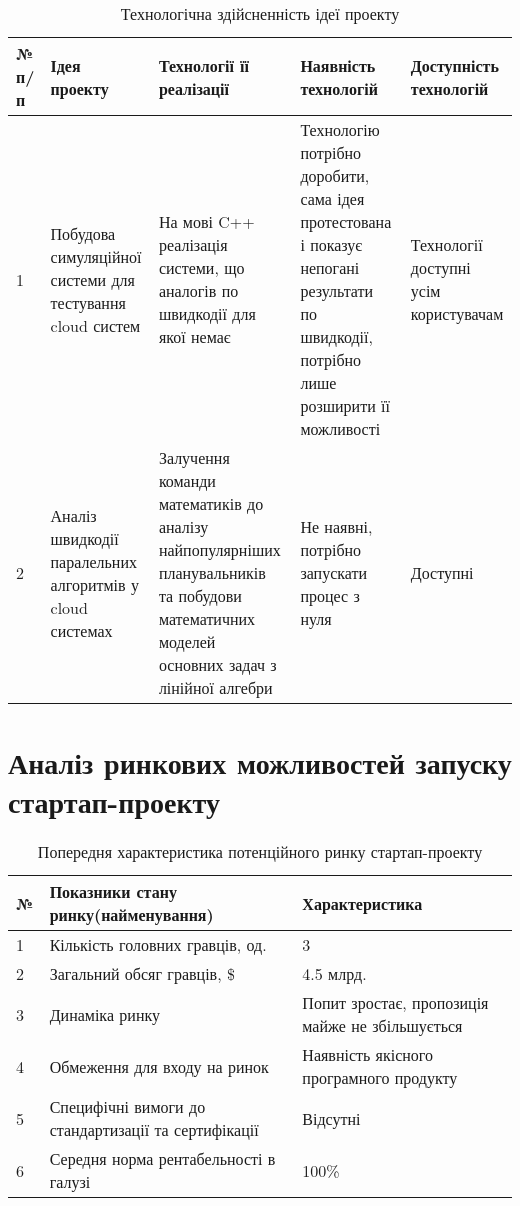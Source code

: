 \begin{table}[H]
	\centering
	\caption{Технологічна здійсненність ідеї проекту}
	\begin{tabular}
		{|p{0.5cm}|p{3.5cm}|p{3.5cm}|p{3.5cm}|p{3.5cm}|} \hline
		
		\bf{№ п/п}
		& \bf{Ідея проекту}
		& \bf{Технології її реалізації}
		& \bf{Наявність технологій}
		& \bf{Доступність технологій}
		\\ \hline
		
		1
		& Побудова симуляційної системи для тестування cloud систем
		& На мові C++ реалізація системи, що аналогів по швидкодії для якої немає
		& Технологію потрібно доробити, сама ідея протестована і показує непогані результати по швидкодії, потрібно лише розширити її можливості
		& Технології доступні усім користувачам
		\\ \hline
		
		2
		& Аналіз швидкодії паралельних алгоритмів у cloud системах
		& Залучення команди математиків до аналізу найпопулярніших планувальників та побудови математичних моделей основних задач з лінійної алгебри
		& Не наявні, потрібно запускати процес з нуля
		& Доступні
		\\ \hline
	\end{tabular}
\end{table}

\section{Аналіз ринкових можливостей запуску стартап-проекту}

\begin{table}[H]
	\centering
	\caption{Попередня характеристика потенційного ринку стартап-проекту}
	\begin{center}
		\begin{tabular}
			{|l|p{6cm}|p{4cm}|}\hline
			\bf{№} & \bf{Показники стану ринку(найменування)} & \bf{Характеристика} \\ \hline
			1 & Кількість головних гравців, од. & 3 \\ \hline
			2 & Загальний обсяг гравців, \$ & 4.5 млрд. \\ \hline
			3 & Динаміка ринку & Попит зростає, пропозиція майже не збільшується \\ \hline
			4 & Обмеження для входу на ринок& Наявність якісного програмного продукту \\ \hline
			5 & Специфічні вимоги до стандартизації та сертифікації& Відсутні \\ \hline
			6 & Середня норма рентабельності в галузі & 100\% \\ \hline
		\end{tabular}
	\end{center}
\end{table}

